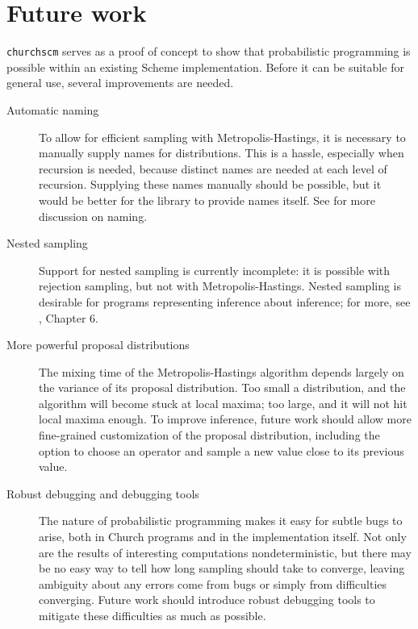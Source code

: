 \documentclass{article}
\begin{document}
\section{Future work}
\label{sec:futurework}

\texttt{churchscm} serves as a proof of concept to show that
probabilistic programming is possible within an existing Scheme
implementation. Before it can be suitable for general use, several
improvements are needed.

\begin{description}

\item[Automatic naming] To allow for efficient sampling with
  Metropolis-Hastings, it is necessary to manually supply names for
  distributions. This is a hassle, especially when recursion is
  needed, because distinct names are needed at each level of
  recursion. Supplying these names manually should be possible, but it
  would be better for the library to provide names itself. See
  \cite{wingate_lightweight_2011} for more discussion on naming.

\item[Nested sampling] Support for nested sampling is currently
  incomplete: it is possible with rejection sampling, but not with
  Metropolis-Hastings. Nested sampling is desirable for programs
  representing inference about inference; for more, see
  \cite{goodman_probabilistic_????}, Chapter 6.

\item[More powerful proposal distributions] The mixing time of the
  Metropolis-Hastings algorithm depends largely on the variance of its
  proposal distribution. Too small a distribution, and the algorithm
  will become stuck at local maxima; too large, and it will not hit
  local maxima enough. To improve inference, future work should allow
  more fine-grained customization of the proposal distribution,
  including the option to choose an operator and sample a new value
  close to its previous value.

\item[Robust debugging and debugging tools] The nature of
  probabilistic programming makes it easy for subtle bugs to arise,
  both in Church programs and in the implementation itself. Not only
  are the results of interesting computations nondeterministic, but
  there may be no easy way to tell how long sampling should take to
  converge, leaving ambiguity about any errors come from bugs or
  simply from difficulties converging. Future work should introduce
  robust debugging tools to mitigate these difficulties as much as
  possible.

\end{description}



\end{document}
